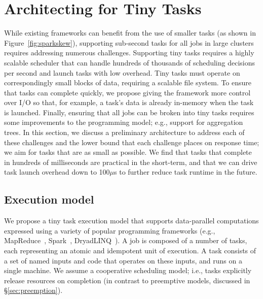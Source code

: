 \section{Architecting for Tiny Tasks}
\label{sec:architecture}

While existing frameworks can benefit from the use of smaller tasks (as shown
in Figure~\ref{fig:sparkskew}), supporting sub-second tasks for all jobs in large clusters
requires addressing numerous challenges.
Supporting tiny tasks requires a highly scalable scheduler that can
handle hundreds of thousands of scheduling decisions per second and
launch tasks with low overhead. Tiny tasks must operate on correspondingly
small blocks of data, requiring a scalable file system. To ensure that
tasks can complete quickly, we propose giving the framework more control
over I/O so that, for example, a task's data is already in-memory when the
task is launched.
Finally, ensuring
that all jobs can be broken into tiny tasks requires some improvements
to the programming model; e.g., support for aggregation trees.
In this section, we discuss a preliminary architecture to address
each of these challenges and the lower bound that each challenge places
on response time; we aim for tasks that are as small as possible.
We find that tasks that complete in hundreds of milliseconds
are practical in the short-term, and that we can drive task launch overhead
down to 100$\mu$s to further reduce task runtime in the future.

\subsection{Execution model}
We propose a tiny task execution model that supports data-parallel computations
expressed using a variety of popular programming frameworks (e.g.,
MapReduce~\cite{dean2008mapreduce}, Spark~\cite{zaharia2010spark},
DryadLINQ~\cite{yu2008dryadlinq}).
A job is composed of a number of tasks, each representing an atomic
and idempotent unit of execution. A task consists of a set of named inputs
and code that operates on these inputs, and runs on a single machine.
We assume a cooperative scheduling model; i.e., tasks explicitly release
resources on completion (in contrast to preemptive models, discussed in
\S\ref{sec:preemption}).


